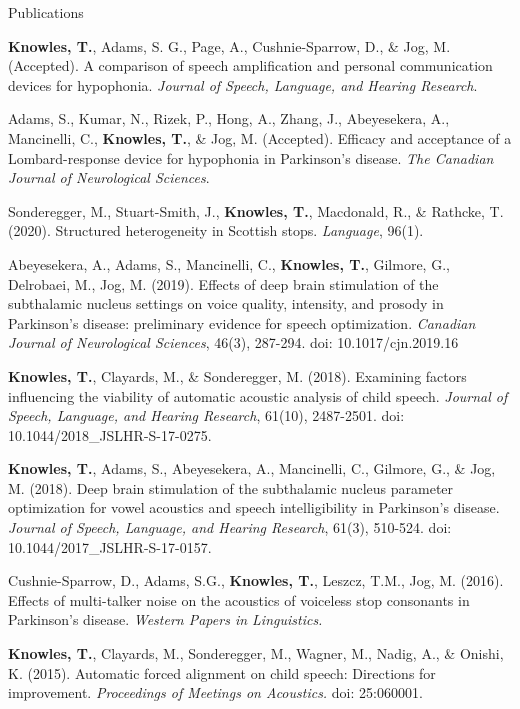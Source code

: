 \documentclass{resume} %
\begin{document}

\begin{rSection}{Publications}

{\bf Knowles, T.}, Adams, S. G., Page, A., Cushnie-Sparrow, D., \& Jog, M. (Accepted). A comparison of speech amplification and personal communication devices for hypophonia. \emph{Journal of Speech, Language, and Hearing Research}.

Adams, S., Kumar, N., Rizek, P., Hong, A., Zhang, J., Abeyesekera, A., Mancinelli, C., {\bf Knowles, T.}, \& Jog, M. (Accepted). Efficacy and acceptance of a Lombard-response device for hypophonia in Parkinson’s disease. \emph{The Canadian Journal of Neurological Sciences}.

Sonderegger, M., Stuart-Smith, J., {\bf Knowles, T.}, Macdonald, R., \& Rathcke, T. (2020). Structured heterogeneity in Scottish stops. \emph{Language}, 96(1).

Abeyesekera, A., Adams, S., Mancinelli, C., {\bf Knowles, T.}, Gilmore, G., Delrobaei, M., Jog, M. (2019).  Effects of deep brain stimulation of the subthalamic nucleus settings on voice quality, intensity, and prosody in Parkinson’s disease: preliminary evidence for speech optimization. \emph{Canadian Journal of Neurological Sciences}, 46(3), 287-294. doi: 10.1017/cjn.2019.16	

{\bf Knowles, T.}, Clayards, M., \& Sonderegger, M. (2018). Examining factors influencing the viability of automatic acoustic analysis of child speech. \emph{Journal of Speech, Language, and Hearing Research}, 61(10), 2487-2501. doi: 10.1044/2018\_JSLHR-S-17-0275.

{\bf Knowles, T.}, Adams, S., Abeyesekera, A., Mancinelli, C., Gilmore, G., \& Jog, M. (2018). Deep brain stimulation of the subthalamic nucleus parameter optimization for vowel acoustics and speech intelligibility in Parkinson's disease. \emph{Journal of Speech, Language, and Hearing Research}, 61(3), 510-524. doi: 10.1044/2017\_JSLHR-S-17-0157.

Cushnie-Sparrow, D., Adams, S.G., {\bf Knowles, T.}, Leszcz, T.M., Jog, M. (2016). Effects of multi-talker noise on the acoustics of voiceless stop consonants in Parkinson's disease. \emph{Western Papers in Linguistics.}

{\bf Knowles, T.}, Clayards, M., Sonderegger, M., Wagner, M., Nadig, A., \& Onishi, K. (2015). Automatic forced alignment on child speech: Directions for improvement. \emph{Proceedings of Meetings on Acoustics.} doi: 25:060001.


\end{rSection}
\end{document}
